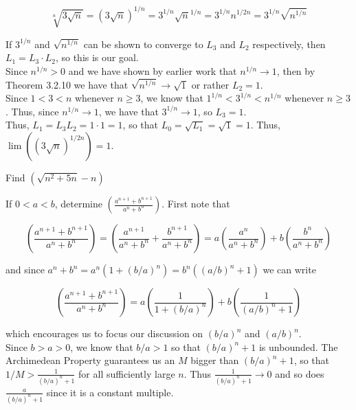\documentclass[paper=a4, fontsize=11pt]{scrartcl} %
\numberwithin{equation}{section} %
\numberwithin{figure}{section} %
\numberwithin{table}{section} %
\begin{document}
\begin{equation*}
\sqrt[n]{3 \sqrt{n}} = (3 \sqrt{n})^{1/n} = 3^{1/n} \sqrt{n}^{1/n} = 3^{1/n} n^{1/2n} = 3^{1/n} \sqrt{n^{1/n}}
\end{equation*}

If $3^{1/n}$ and $\sqrt{n^{1/n}}$ can be shown to converge to $L_3$ and $L_2$ respectively, then $L_1 = L_3 \cdot L_2$, so this is our goal.\\

Since $n^{1/n} > 0$ and we have shown by earlier work that $n^{1/n} \rightarrow 1$, then by Theorem 3.2.10 we have that $\sqrt{n^{1/n}} \rightarrow \sqrt{1}$ or rather $L_2 = 1$.\\

Since $1 < 3 < n$ whenever $n \geq 3$, we know that $1^{1/n} < 3^{1/n} < n^{1/n}$ whenever $n \geq 3$. Thus, since $n^{1/n} \rightarrow 1$, we have that $3^{1/n} \rightarrow 1$, so $L_3 = 1$.\\

Thus, $L_1 = L_3 L_2 = 1 \cdot 1 = 1$, so that $L_0 = \sqrt{L_1} = \sqrt{1} = 1$. Thus, $\lim\left((3\sqrt{n})^{1/2n}\right) = 1$. \done

 Find $(\sqrt{n^2 + 5n} - n)$
\pf

\newcommand{\anp}{a^{n+1}}
\newcommand{\bnp}{b^{n+1}}
 If $0 < a < b$, determine $\left(\frac{\anp + \bnp}{a^n + b^n}\right)$.
\pf First note that

\begin{equation*}
\left(\frac{\anp + \bnp}{a^n + b^n}\right) = 
\left(\frac{\anp}{a^n + b^n} + \frac{\bnp}{a^n + b^n}\right) = 
a \left(\frac{a^n}{a^n + b^n}\right) + b \left(\frac{b^n}{a^n + b^n}\right) 
\end{equation*}

and since $a^n + b^n = a^n(1 + (b/a)^n) = b^n((a/b)^n + 1)$ we can write 

\begin{equation*}
\left(\frac{\anp + \bnp}{a^n + b^n}\right) = 
a \left(\frac{1}{1 + (b/a)^n}\right) + b \left(\frac{1}{(a/b)^n + 1}\right) 
\end{equation*}

which encourages us to focus our discussion on $(b/a)^n$ and $(a/b)^n$.\\

Since $b > a > 0$, we know that $b/a > 1$ so that $(b/a)^n + 1$ is unbounded. The Archimedean Property guarantees us an $M$ bigger than $(b/a)^n + 1$, so that $1/M > \frac{1}{(b/a)^n + 1}$ for all sufficiently large $n$. Thus $\frac{1}{(b/a)^n + 1} \rightarrow 0$ and so does $\frac{a}{(b/a)^n + 1}$ since it is a constant multiple.\\
\end{document}
